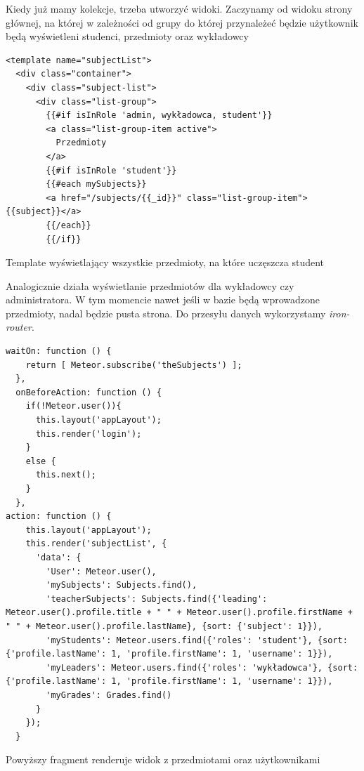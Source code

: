 \documentclass{xmgr}
\begin{document}
Kiedy już mamy kolekcje, trzeba utworzyć widoki. Zaczynamy od widoku strony głównej, na której w zależności od grupy do której przynależeć będzie użytkownik będą wyświetleni studenci, przedmioty oraz wykładowcy

\begin{listing}[H]
\begin{verbatim}
<template name="subjectList">
  <div class="container">
    <div class="subject-list">
      <div class="list-group">
        {{#if isInRole 'admin, wykładowca, student'}}
        <a class="list-group-item active">
          Przedmioty
        </a>
        {{#if isInRole 'student'}}
        {{#each mySubjects}}
        <a href="/subjects/{{_id}}" class="list-group-item">{{subject}}</a>
        {{/each}}
        {{/if}}
\end{verbatim}
\caption{Template wyświetlający wszystkie przedmioty, na które uczęszcza student}
\end{listing}

Analogicznie działa wyświetlanie przedmiotów dla wykładowcy czy administratora. W tym momencie nawet jeśli w bazie będą wprowadzone przedmioty, nadal będzie pusta strona. Do przesyłu danych wykorzystamy \textit{iron-router}.

\begin{listing}[H]
\begin{verbatim}
waitOn: function () {
    return [ Meteor.subscribe('theSubjects') ];
  },
  onBeforeAction: function () {
    if(!Meteor.user()){
      this.layout('appLayout');
      this.render('login');
    }
    else {
      this.next();
    }
  },
action: function () {
    this.layout('appLayout');
    this.render('subjectList', {
      'data': {
        'User': Meteor.user(),
        'mySubjects': Subjects.find(),
        'teacherSubjects': Subjects.find({'leading': Meteor.user().profile.title + " " + Meteor.user().profile.firstName + " " + Meteor.user().profile.lastName}, {sort: {'subject': 1}}),
        'myStudents': Meteor.users.find({'roles': 'student'}, {sort: {'profile.lastName': 1, 'profile.firstName': 1, 'username': 1}}),
        'myLeaders': Meteor.users.find({'roles': 'wykładowca'}, {sort: {'profile.lastName': 1, 'profile.firstName': 1, 'username': 1}}),
        'myGrades': Grades.find()
      }
    });
  }
\end{verbatim}
\caption{Powyższy fragment renderuje widok z przedmiotami oraz użytkownikami}
\end{listing}
\end{document}
